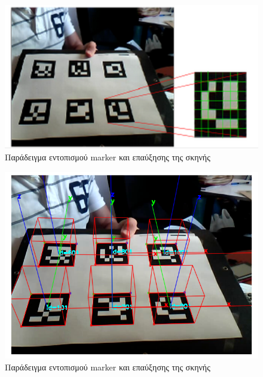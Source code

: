 \begin{figure}[H]
    \centering
    \includegraphics[scale=0.6, angle=0]{Files/Figures/aruco5.png}
    \caption[Παράδειγμα εντοπισμού marker και επαύξησης της σκηνής \cite{howmarkerswork}]{ Παράδειγμα εντοπισμού marker και επαύξησης της σκηνής \cite{howmarkerswork}}
    \label{fig:aruco5}
\end{figure}

\begin{figure}[H]
    \centering
    \includegraphics[scale=0.6, angle=0]{Files/Figures/aruco6.png}
    \caption[Παράδειγμα εντοπισμού marker και επαύξησης της σκηνής \cite{howmarkerswork}]{ Παράδειγμα εντοπισμού marker και επαύξησης της σκηνής \cite{howmarkerswork}}
    \label{fig:aruco5}
\end{figure}


